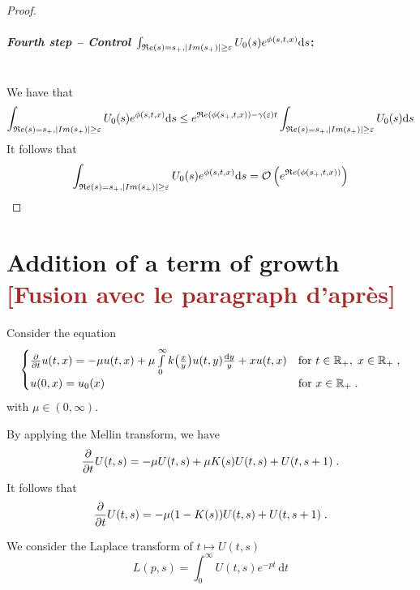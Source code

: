 \documentclass[11pt]{amsart}
\renewcommand{\Re}{\mathfrak{R}e}
\newcommand{\diff}{\,\mathrm{d}}
\newcommand{\ndr}[1]{\textcolor{brown}{[#1]}}
\begin{document}
\begin{proof}
\medskip
\paragraph{\textit{Fourth step -- Control $\int_{\Re(s) = s_+, |Im(s_+)| \geq \varepsilon} U_0(s) e^{\phi(s, t, x)} \ds$}:}\mbox{}\\
We have that 
\begin{align*}
    \int_{\Re(s) = s_+, |Im(s_+)| \geq \varepsilon} U_0(s) e^{\phi(s, t, x)}
    \ds 
    &\leq  e^{\Re(\phi(s_+, t, x)) - \gamma(\varepsilon)t} \int_{\Re(s) = s_+, |Im(s_+)| \geq \varepsilon} U_0(s) \ds \\
\end{align*}
It follows that 
\begin{align*}
    \int_{\Re(s) = s_+, |Im(s_+)| \geq \varepsilon} U_0(s) e^{\phi(s, t, x)} 
    \ds = \Ocal \left( e^{\Re(\phi(s_+, t, x))} \right)
\end{align*}
\end{proof}


\section{Addition of a term of growth \ndr{Fusion avec le paragraph d'après}}

Consider the equation
\begin{equation*}
    \begin{cases}
        \frac{\partial}{\partial t}u(t,x) = - \mu u(t,x) + \mu \int\limits_{0}^{\infty}  k\big( \frac{x}{y}\big) u(t,y) \frac{\mathrm dy}{y} + xu(t,x)
        & \text{for }t \in \mathbb{R}_+, \; x \in \mathbb{R}_+ \; ,
        \\
        u(0, x) = u_0(x)
        & \text{for }x \in \mathbb{R}_+
        \; .
        \end{cases}
\end{equation*}
with $\mu \in (0, \infty)$. 

By applying the Mellin transform, we have
	\begin{equation*}
		\frac{\partial}{\partial t} U(t,s) = - \mu U(t,s) + \mu K(s) U(t,s) + U(t,s+1)
		\; .
	\end{equation*}
It follows that
    \begin{equation}
        \frac{\partial}{\partial t} U(t,s) = - \mu (1-K(s)) U(t,s) + U(t,s+1)
		\; .
        \label{eq:addgrowth}
    \end{equation}

We consider the Laplace transform of $t \mapsto U(t,s)$
$$ L(p,s) = \int_0^\infty U(t,s)e^{-pt}\diff t$$ 
\end{document}
